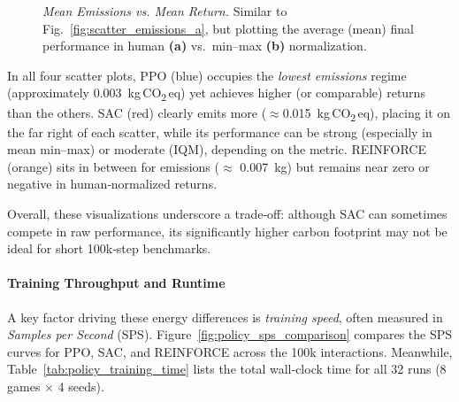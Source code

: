 \begin{figure} 
	\centering
	\quad
	\caption{\emph{Mean Emissions vs. Mean Return.}
		Similar to Fig.~\ref{fig:scatter_emissions_a}, but plotting the average (mean) final performance in human \textbf{(a)} vs.\ min--max \textbf{(b)} normalization.}
	\label{fig:scatter_emissions_b}
\end{figure}

In all four scatter plots, PPO (blue) occupies the \emph{lowest emissions} regime (approximately \num{0.003}~kg\,CO\textsubscript{2}\,eq) yet achieves higher (or comparable) returns than the others. SAC (red) clearly emits more ($\approx$\num{0.015}~kg\,CO\textsubscript{2}\,eq), placing it on the far right of each scatter, while its performance can be strong (especially in mean min–max) or moderate (IQM), depending on the metric. REINFORCE (orange) sits in between for emissions ($\approx$ \num{0.007}~kg) but remains near zero or negative in human‐normalized returns.

Overall, these visualizations underscore a trade‐off: although SAC can sometimes compete in raw performance, its significantly higher carbon footprint may not be ideal for short 100k‐step benchmarks.

\paragraph{Training Throughput and Runtime}
A key factor driving these energy differences is \emph{training speed}, often measured in \emph{Samples per Second} (SPS). Figure~\ref{fig:policy_sps_comparison} compares the SPS curves for PPO, SAC, and REINFORCE across the 100k interactions. Meanwhile, Table~\ref{tab:policy_training_time} lists the total wall‐clock time for all 32 runs (8 games × 4 seeds).

